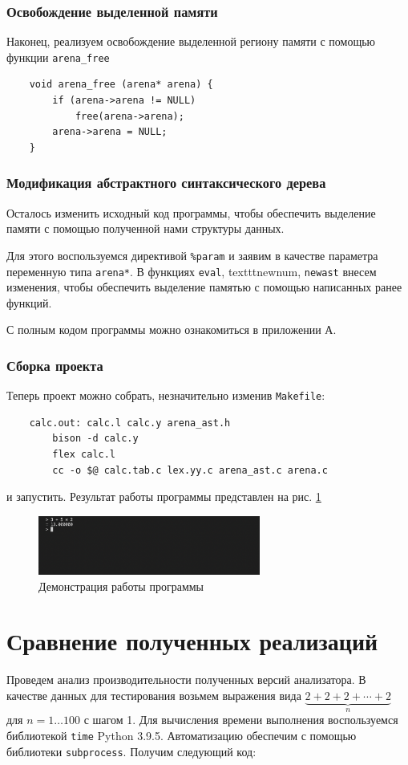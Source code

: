 \documentclass[coursework]{SCWorks}
\begin{document}
\subsubsection{Освобождение выделенной памяти}
Наконец, реализуем освобождение выделенной региону памяти с помощью функции 
\verb|arena_free|
\begin{verbatim}
    void arena_free (arena* arena) {
        if (arena->arena != NULL)
            free(arena->arena);
        arena->arena = NULL;
    }
\end{verbatim}

\subsubsection{Модификация абстрактного синтаксического дерева}
Осталось изменить исходный код программы, чтобы обеспечить выделение памяти с 
помощью полученной нами структуры данных.

Для этого воспользуемся директивой \texttt{\%param} и заявим в качестве 
параметра переменную типа \texttt{arena*}. В функциях \texttt{eval}, 
texttt{newnum}, \texttt{newast} внесем изменения, чтобы обеспечить выделение 
памятью с помощью написанных ранее функций.

С полным кодом программы можно ознакомиться в приложении А.

\subsubsection{Сборка проекта}
Теперь проект можно собрать, незначительно изменив \texttt{Makefile}:
\begin{verbatim}
    calc.out: calc.l calc.y arena_ast.h
        bison -d calc.y
        flex calc.l
        cc -o $@ calc.tab.c lex.yy.c arena_ast.c arena.c
\end{verbatim}
и запустить. Результат работы программы представлен на рис. \ref{img:demon}
\begin{figure}[H]
    \centering
    \includegraphics[width=0.65\textwidth]{naivetest.png}
    \caption{Демонстрация работы программы}
    \label{img:demon}
\end{figure}    

\section{Сравнение полученных реализаций}
Проведем анализ производительности полученных версий анализатора. В качестве 
данных для тестирования возьмем выражения вида 
$\underbrace{2 + 2 + 2 + \cdots + 2}_{n}$ для $n = 1 \dots 100$ с шагом 1. Для 
вычисления времени выполнения воспользуемся библиотекой \texttt{time} 
Python 3.9.5. Автоматизацию обеспечим с помощью библиотеки \texttt{subprocess}. 
Получим следующий код:
\inputminted{python}{requirements/src/test.py}
\end{document}

